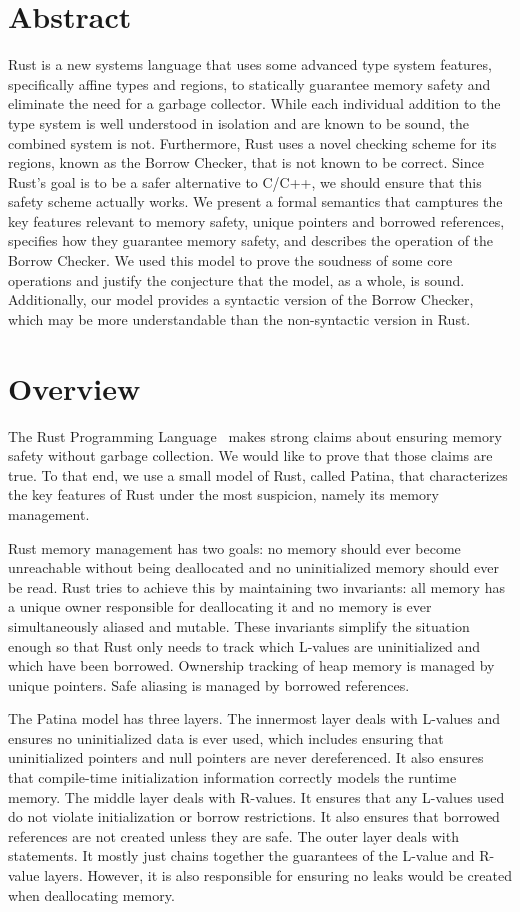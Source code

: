 \section*{Abstract}
Rust is a new systems language that uses some advanced type system features,
specifically affine types and regions, to statically guarantee memory
safety and eliminate the need for a garbage collector.
While each individual addition to the type system is well understood
in isolation and are known to be sound, the combined system is not.
Furthermore, Rust uses a novel checking scheme for its regions, known
as the Borrow Checker, that is not known to be correct.
Since Rust's goal is to be a safer alternative to C/C++, we should
ensure that this safety scheme actually works. We present a formal
semantics that camptures the key features relevant to memory safety,
unique pointers and borrowed references, specifies how they guarantee
memory safety, and describes the operation of the Borrow Checker.
We used this model to prove the soudness of some core operations
and justify the conjecture that the model, as a whole, is sound.
Additionally, our model provides a syntactic version of the Borrow
Checker, which may be more understandable than the non-syntactic version
in Rust.

\section*{Overview}
The Rust Programming Language~\cite{rust} makes strong claims about 
ensuring memory safety without garbage collection.
We would like to prove that those claims are true.
To that end, we use a small model of Rust, called Patina, that characterizes the key
features of Rust under the most suspicion, namely its memory management.

Rust memory management has two goals:
no memory should ever become unreachable without being deallocated
and no uninitialized memory should ever be read.
Rust tries to achieve this by maintaining two invariants:
all memory has a unique owner responsible for deallocating it and
no memory is ever simultaneously aliased and mutable.
These invariants simplify the situation enough so that
Rust only needs to track which L-values are uninitialized and which have been borrowed.
Ownership tracking of heap memory is managed by unique pointers.
Safe aliasing is managed by borrowed references.

The Patina model has three layers.
The innermost layer deals with L-values and ensures 
no uninitialized data is ever used, which includes ensuring
that uninitialized pointers and null pointers are never dereferenced.
It also ensures that compile-time initialization information correctly
models the runtime memory.
The middle layer deals with R-values.
It ensures that any L-values used do not violate initialization or borrow restrictions.
It also ensures that borrowed references are not created unless they are safe.
The outer layer deals with statements.
It mostly just chains together the guarantees of the L-value and R-value layers.
However, it is also responsible for ensuring no leaks would be created when deallocating memory.

